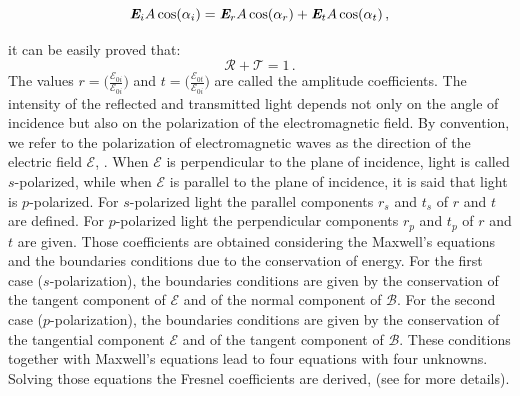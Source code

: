 \begin{equation}
\textit{\textbf{E}}_i A\cos(\alpha_i) = \textit{\textbf{E}}_r A\cos(\alpha_r)+\textit{\textbf{E}}_t A\cos(\alpha_t)\,,
\end{equation}

it can be easily proved that:
\begin{equation}
\mathcal{R}+\mathcal{T}=1\,.
\end{equation}
The values $r = \Big(\frac{\boldsymbol{\mathcal{E}}_{0 i}}{\boldsymbol{\mathcal{E}}_{0 i}}\Big)$ and 
$t = \Big(\frac{\boldsymbol{\mathcal{E}}_{0 t}}{\boldsymbol{\mathcal{E}}_{0 i}}\Big)$ are called the amplitude coefficients.  
The intensity of the reflected and transmitted light depends not only on the angle of incidence but also on the polarization of the electromagnetic field.
By convention, we refer to the polarization of electromagnetic waves as the direction of the electric field $\boldsymbol{\mathcal{E}}$, 
\cite{feynman1964feynman}. When $\boldsymbol{\mathcal{E}}$ is perpendicular to the plane of incidence, light is called $s$-polarized, while when
$\boldsymbol{\mathcal{E}}$ is parallel to the plane of incidence, it is said that light is $p$-polarized.
For $s$-polarized light the parallel components $r_s$ and $t_s$ of $r$ and $t$ are defined. 
For $p$-polarized light the perpendicular components $r_p$ and $t_p$ of $r$ and $t$ are given. 
Those coefficients are obtained considering the Maxwell's equations and the boundaries conditions due to the conservation of energy.
For the first case ($s$-polarization), the boundaries conditions are given by the conservation of the tangent component of $\boldsymbol{\mathcal{E}}$ and of the normal component of $\boldsymbol{\mathcal{B}}$. For the second case ($p$-polarization), the boundaries conditions are given by the conservation of the tangential component $\boldsymbol{\mathcal{E}}$ and of the tangent component of $\boldsymbol{\mathcal{B}}$. These conditions together with Maxwell's equations lead to four equations with four unknowns.
Solving those equations the Fresnel coefficients are derived, (see  \cite{born2013principles, hecht1998hecht} for more details). 
